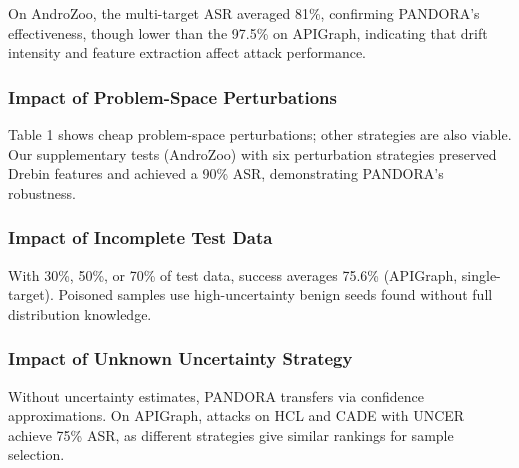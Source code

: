 On AndroZoo, the multi-target ASR averaged 81\%, confirming PANDORA’s effectiveness, though lower than the 97.5\% on APIGraph, indicating that drift intensity and feature extraction affect attack performance.

\subsubsection{Impact of Problem-Space Perturbations}
\label{Impact of Problem-Space Perturbationsn}
Table 1 shows cheap problem-space perturbations; other strategies are also viable. Our supplementary tests (AndroZoo) with six perturbation strategies preserved Drebin features and achieved a 90\% ASR, demonstrating PANDORA’s robustness.

\subsubsection{Impact of Incomplete Test Data}
\label{Impact of Incomplete Test Data}
With 30\%, 50\%, or 70\% of test data, success averages 75.6\% (APIGraph, single-target). Poisoned samples use high-uncertainty benign seeds found without full distribution knowledge.

\subsubsection{Impact of Unknown Uncertainty Strategy}
\label{Impact of Unknown Uncertainty Strategy}
Without uncertainty estimates, PANDORA transfers via confidence approximations.
On APIGraph, attacks on HCL and CADE with UNCER achieve 75\% ASR, as different strategies give similar rankings for sample selection.

